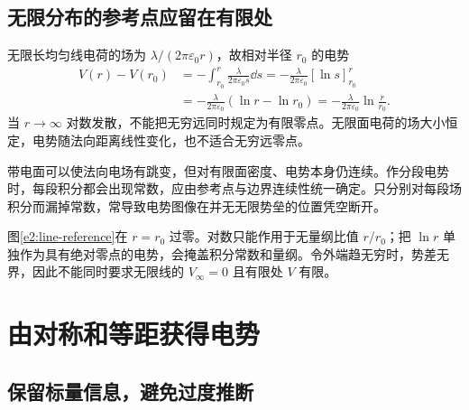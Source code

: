 \subsection{无限分布的参考点应留在有限处}

无限长均匀线电荷的场为 $\lambda/(2\pi\varepsilon_0r)$，故相对半径 $r_0$ 的电势
\[
 \begin{aligned}
 V(r)-V(r_0)
 &=-\int_{r_0}^{r}\frac{\lambda}{2\pi\varepsilon_0s}\dd s
 =-\frac{\lambda}{2\pi\varepsilon_0}[\ln s]_{r_0}^{r}\\
 &=-\frac{\lambda}{2\pi\varepsilon_0}(\ln r-\ln r_0)
 =-\frac{\lambda}{2\pi\varepsilon_0}\ln\frac r{r_0}.
\end{aligned}
\]
当 $r\to\infty$ 对数发散，不能把无穷远同时规定为有限零点。无限面电荷的场大小恒定，电势随法向距离线性变化，也不适合无穷远零点。

带电面可以使法向电场有跳变，但对有限面密度、电势本身仍连续。作分段电势时，每段积分都会出现常数，应由参考点与边界连续性统一确定。只分别对每段场积分而漏掉常数，常导致电势图像在并无无限势垒的位置凭空断开。



图\ref{e2:line-reference}在 $r=r_0$ 过零。对数只能作用于无量纲比值 $r/r_0$；把 $\ln r$ 单独作为具有绝对零点的电势，会掩盖积分常数和量纲。令外端趋无穷时，势差无界，因此不能同时要求无限线的 $V_\infty=0$ 且有限处 $V$ 有限。

\section{由对称和等距获得电势}
\subsection{保留标量信息，避免过度推断}

